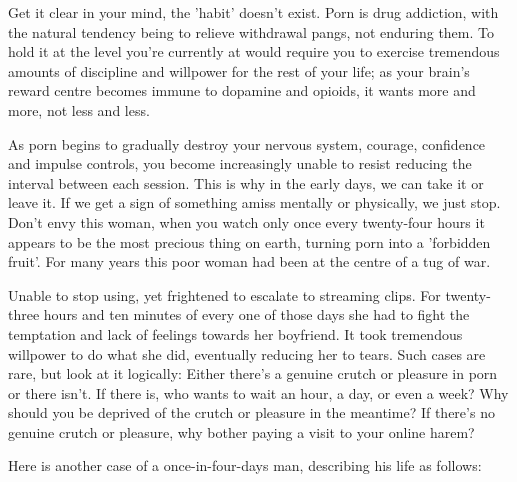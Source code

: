 \documentclass[
]{book}
\begin{document}
Get it clear in your mind, the 'habit' doesn't exist. Porn is drug addiction, with the natural tendency being to relieve withdrawal pangs, not enduring them. To hold it at the level you're currently at would require you to exercise tremendous amounts of discipline and willpower for the rest of your life; as your brain's reward centre becomes immune to dopamine and opioids, it wants more and more, not less and less.

As porn begins to gradually destroy your nervous system, courage, confidence and impulse controls, you become increasingly unable to resist reducing the interval between each session. This is why in the early days, we can take it or leave it. If we get a sign of something amiss mentally or physically, we just stop. Don't envy this woman, when you watch only once every twenty-four hours it appears to be the most precious thing on earth, turning porn into a 'forbidden fruit'. For many years this poor woman had been at the centre of a tug of war.

Unable to stop using, yet frightened to escalate to streaming clips. For twenty-three hours and ten minutes of every one of those days she had to fight the temptation and lack of feelings towards her boyfriend. It took tremendous willpower to do what she did, eventually reducing her to tears. Such cases are rare, but look at it logically: Either there's a genuine crutch or pleasure in porn or there isn't. If there is, who wants to wait an hour, a day, or even a week? Why should you be deprived of the crutch or pleasure in the meantime? If there's no genuine crutch or pleasure, why bother paying a visit to your online harem?

Here is another case of a once-in-four-days man, describing his life as follows:
\end{document}
